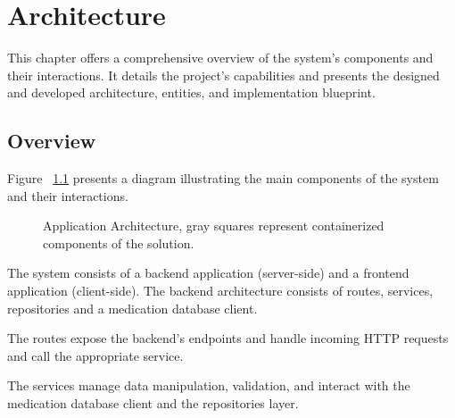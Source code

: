 %
%
\chapter{Architecture} \label{cap:architecture}

This chapter offers a comprehensive overview of the system's components and their interactions. It details the project's capabilities and presents the designed and developed architecture, entities, and implementation blueprint.

\section{Overview}

Figure ~\ref{fig:architecture} presents a diagram illustrating the main components of the system and their interactions. 

\begin{figure}[h]
	\begin{center}
	\end{center}
	\caption{Application Architecture, gray squares represent containerized components of the solution.}\label{fig:architecture}
\end{figure}


The system consists of a backend application (server-side) and a frontend application (client-side).
The backend architecture consists of routes, services, repositories and a medication database client.

The routes expose the backend's endpoints and handle incoming HTTP requests and call the appropriate service.

The services manage data manipulation, validation, and interact with the medication database client and the repositories layer.

